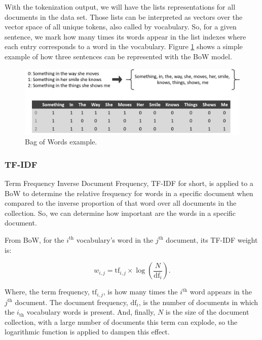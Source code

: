 	With the tokenization output, we will have the lists representations for all documents in the data set. Those lists can be interpreted as vectors over the vector space of all unique tokens, also called by vocabulary. So, for a given sentence, we mark how many times its words appear in the list indexes where each entry corresponds to a word in the vocabulary. Figure \ref{fig:bag-of-words} shows a simple example of how three sentences can be represented with the BoW model.
	
	\begin{figure}[h!]
		\centering
		\includegraphics[width=\linewidth]{01.Chapters/02.Background/bag-of-words}
		\caption{Bag of Words example.}
		\label{fig:bag-of-words}
	\end{figure}
	
	\subsubsection{TF-IDF}
	
	Term Frequency Inverse Document Frequency, TF-IDF for short, is applied to a BoW to determine the relative frequency for words in a specific document when compared to the inverse proportion of that word over all documents in the collection. So, we can determine how important are the words in a specific document. 
	
	From BoW, for the $i^{\text{th}}$ vocabulary's word in the $j^{\text{th}}$ document, its TF-IDF weight is:
	
	\begin{equation}
	\label{eq:tf-idf}
	w_{i, j} = \text{tf}_{i, j} \times \log\left(\dfrac{N}{\text{df}_{i}}\right) \text{.}
	\end{equation}
	
	Where, the term frequency, $\text{tf}_{i, j}$, is how many times the $i^{\text{th}}$ word appears in the $j^{\text{th}}$ document. The document frequency, $\text{df}_{i}$, is the number of documents in which the $i_{\text{th}}$ vocabulary words is present. And, finally, $N$ is the size of the document collection, with a large number of documents this term can explode, so the logarithmic function is applied to dampen this effect.
	
